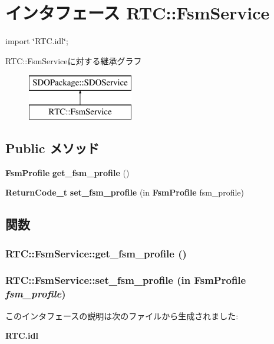 \section{インタフェース RTC::FsmService}
\label{interfaceRTC_1_1FsmService}


{\ttfamily import \char`\"{}RTC.idl\char`\"{};}

RTC::FsmServiceに対する継承グラフ\begin{figure}[H]
\begin{center}
\leavevmode
\includegraphics[height=2cm]{interfaceRTC_1_1FsmService}
\end{center}
\end{figure}
\subsection*{Public メソッド}
\begin{DoxyCompactItemize}
\item 
{\bf FsmProfile} {\bf get\_\-fsm\_\-profile} ()
\item 
{\bf ReturnCode\_\-t} {\bf set\_\-fsm\_\-profile} (in {\bf FsmProfile} fsm\_\-profile)
\end{DoxyCompactItemize}


\subsection{関数}
\subsubsection[{get\_\-fsm\_\-profile}]{ RTC::FsmService::get\_\-fsm\_\-profile ()}\label{interfaceRTC_1_1FsmService_a72907dcf0995ba5e06b9867d2954944a}
\subsubsection[{set\_\-fsm\_\-profile}]{ RTC::FsmService::set\_\-fsm\_\-profile (in {\bf FsmProfile} {\em fsm\_\-profile})}\label{interfaceRTC_1_1FsmService_a492ee38ee1914d430c2f456861e2471f}


このインタフェースの説明は次のファイルから生成されました:\begin{DoxyCompactItemize}
\item 
{\bf RTC.idl}\end{DoxyCompactItemize}
